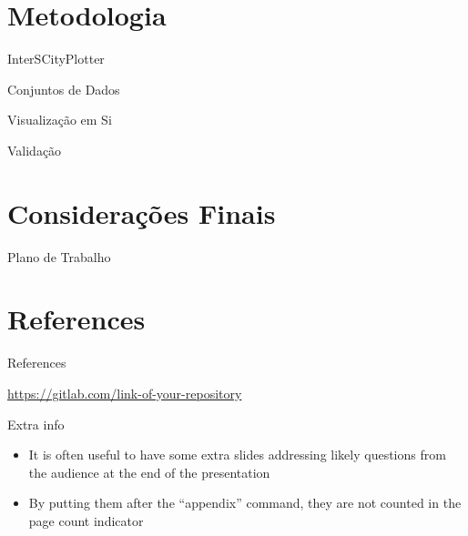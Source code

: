 \section{Metodologia}

\begin{frame}{InterSCityPlotter}
\end{frame}

\begin{frame}{Conjuntos de Dados}
\end{frame}

\begin{frame}{Visualização em Si}
\end{frame}

\begin{frame}{Validação}
\end{frame}

\section{Considerações Finais}

\begin{frame}{Plano de Trabalho}
\end{frame}

\section{References}

\begin{frame}[allowframebreaks]{References}
  \nocite{bronevetsky02, schmidt03:MSc, FSF:GNU-GPL, CORBA:spec, MenaChalco08, natbib, biblatex, eco:09}
  \printbibliography
\end{frame}

\begin{frame}{\insertshorttitle}
  \overview

  {%
    \centering\noindent%
    \url{https://gitlab.com/link-of-your-repository}\par
  }

\end{frame}

\showqrcode

\appendix

\begin{frame}{Extra info}
  \begin{itemize}
    \item It is often useful to have some extra slides addressing likely questions from the audience at the end of the presentation
    \item By putting them after the ``appendix'' command, they are not counted in the page count indicator
  \end{itemize}
\end{frame}
